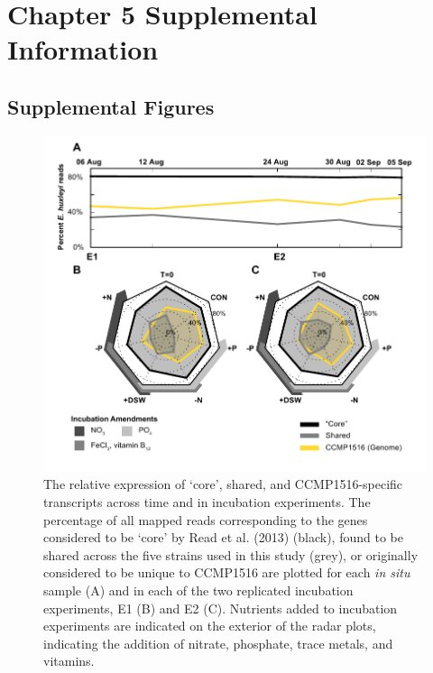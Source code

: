 \chapter{Chapter 5 Supplemental Information}
\label{sec:app5}
\clearpage
\section{Supplemental Figures}



\begin{figure}[h!]

  \centering
  \includegraphics[width=1\textwidth]{Images/C6_FigureS8_core_genes.pdf}
  \caption[The relative expression of `core', shared, and CCMP1516-specific transcripts across time and in incubation experiments]{The relative expression of `core', shared, and CCMP1516-specific transcripts across time and in incubation experiments. The percentage of all mapped reads corresponding to the genes considered to be `core' by Read et al. (2013) (black), found to be shared across the five strains used in this study (grey), or originally considered to be unique to CCMP1516 are plotted for each \textit{in situ} sample (A) and in each of the two replicated incubation experiments, E1 (B) and E2 (C). Nutrients added to incubation experiments are indicated on the exterior of the radar plots, indicating the addition of nitrate, phosphate, trace metals, and vitamins.}
    \label{fig:a5f8}
\end{figure}




